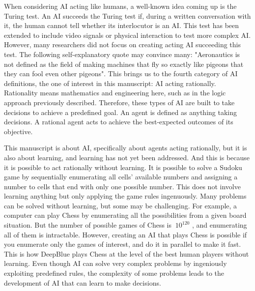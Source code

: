 When considering AI acting like humans, a well-known idea coming up is the Turing test.
An AI succeeds the Turing test if, during a written conversation with it, the human cannot tell whether its interlocutor is an AI.
This test has been extended to include video signals or physical interaction to test more complex AI.
However, many researchers did not focus on creating acting AI succeeding this test.
The following self-explanatory quote may convince many: "Aeronautics is not defined as the field of making machines that fly so exactly like pigeons that they can fool even other pigeons"\citep{russel2010}.
This brings us to the fourth category of AI definitions, the one of interest in this manuscript: AI acting rationally.
Rationality means mathematics and engineering here, such as in the logic approach previously described.
Therefore, these types of AI are built to take decisions to achieve a predefined goal.
An agent is defined as anything taking decisions.
A rational agent acts to achieve the best-expected outcomes of its objective.

This manuscript is about AI, specifically about agents acting rationally, but it is also about learning, and learning has not yet been addressed.
And this is because it is possible to act rationally without learning.
It is possible to solve a Sudoku game by sequentially enumerating all cells' available numbers and assigning a number to cells that end with only one possible number.
This does not involve learning anything but only applying the game rules ingenuously.
Many problems can be solved without learning, but some may be challenging.
For example, a computer can play Chess by enumerating all the possibilities from a given board situation.
But the number of possible games of Chess is $~10^{120}$ \citep{shannon1950xxii}, and enumerating all of them is intractable.
However, creating an AI that plays Chess is possible if you enumerate only the games of interest, and do it in parallel to make it fast.
This is how DeepBlue \citep{campbell2002deep} plays Chess at the level of the best human players without learning.
Even though AI can solve very complex problems by ingeniously exploiting predefined rules, the complexity of some problems leads to the development of AI that can learn to make decisions.

